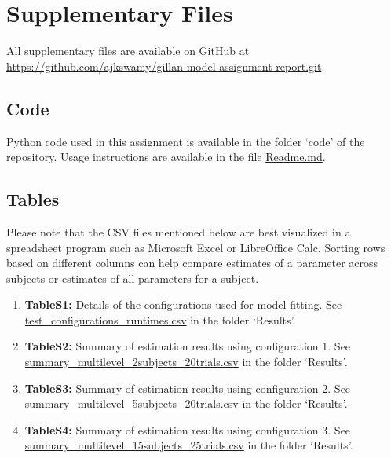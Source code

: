 \documentclass[10pt,a4paper]{article}
\begin{document}
\section*{Supplementary Files}
All supplementary files are available on GitHub at \\{\url{https://github.com/ajkswamy/gillan-model-assignment-report.git}.}
\subsection*{Code}
Python code used in this assignment is available in the folder `code' of the repository. Usage instructions are available in the file \href{https://github.com/ajkswamy/gillan-model-assignment-report/blob/master/Readme.md}{\ttfamily Readme.md}.
\subsection*{Tables}
Please note that the CSV files mentioned below are best visualized in a spreadsheet program such as Microsoft Excel or LibreOffice Calc. Sorting rows based on different columns can help compare estimates of a parameter across subjects or estimates of all parameters for a subject.
\begin{enumerate}
  \label{Tables}
  \item \textbf{TableS1:} Details of the configurations used for model fitting. See \newline\href{https://github.com/ajkswamy/gillan-model-assignment-report/blob/master/Results/test_configurations_runtimes.csv}{\ttfamily test\_configurations\_runtimes.csv} in the folder `Results'.
  \item \textbf{TableS2:} Summary of estimation results using configuration 1. See \newline\href{https://github.com/ajkswamy/gillan-model-assignment-report/blob/master/Results/summary_multilevel_2subjects_20trials.csv}{\ttfamily summary\_multilevel\_2subjects\_20trials.csv} in the folder `Results'.
  \item \textbf{TableS3:} Summary of estimation results using configuration 2. See \newline\href{https://github.com/ajkswamy/gillan-model-assignment-report/blob/master/Results/summary_multilevel_5subjects_20trials.csv}{\ttfamily summary\_multilevel\_5subjects\_20trials.csv} in the folder `Results'.
  \item \textbf{TableS4:} Summary of estimation results using configuration 3. See \newline\href{https://github.com/ajkswamy/gillan-model-assignment-report/blob/master/Results/summary_multilevel_15subjects_25trials.csv}{\ttfamily summary\_multilevel\_15subjects\_25trials.csv} in the folder `Results'. 
\end{enumerate}


\end{document}
